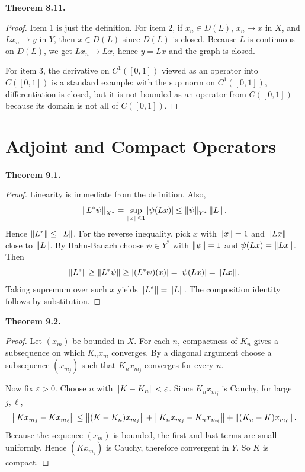 \documentclass[11pt]{article}
\newenvironment{theoremstmt}[1]{%
  \par\medskip\noindent\textbf{Theorem #1. }\itshape
}{\par\medskip}
\begin{document}
\begin{theoremstmt}{8.11}
\thmClosedOperatorFacts
\end{theoremstmt}

\begin{proof}
Item 1 is just the definition. For item 2, if $x_n\in D(L)$, $x_n\to x$ in $X$, and $Lx_n\to y$ in $Y$, then $x\in D(L)$ since $D(L)$ is closed. Because $L$ is continuous on $D(L)$, we get $Lx_n\to Lx$, hence $y=Lx$ and the graph is closed.

For item 3, the derivative on $C^1([0,1])$ viewed as an operator into $C([0,1])$ is a standard example: with the sup norm on $C^1([0,1])$, differentiation is closed, but it is not bounded as an operator from $C([0,1])$ because its domain is not all of $C([0,1])$.
\end{proof}

\section{Adjoint and Compact Operators}

\begin{theoremstmt}{9.1}
\thmAdjoint
\end{theoremstmt}

\begin{proof}
Linearity is immediate from the definition. Also,
\[
\left\lVert L^*\psi\right\rVert_{X^*}=\sup_{\left\lVert x\right\rVert\le 1}\left\lvert \psi(Lx)\right\rvert
\le \left\lVert \psi\right\rVert_{Y^*}\left\lVert L\right\rVert.
\]
Hence $\left\lVert L^*\right\rVert\le \left\lVert L\right\rVert$. For the reverse inequality, pick $x$ with $\left\lVert x\right\rVert=1$ and $\left\lVert Lx\right\rVert$ close to $\left\lVert L\right\rVert$. By Hahn-Banach choose $\psi\in Y^*$ with $\left\lVert \psi\right\rVert=1$ and $\psi(Lx)=\left\lVert Lx\right\rVert$. Then
\[
\left\lVert L^*\right\rVert\ge \left\lVert L^*\psi\right\rVert\ge \left\lvert (L^*\psi)(x)\right\rvert=\left\lvert \psi(Lx)\right\rvert=\left\lVert Lx\right\rVert.
\]
Taking supremum over such $x$ yields $\left\lVert L^*\right\rVert=\left\lVert L\right\rVert$. The composition identity follows by substitution.
\end{proof}

\begin{theoremstmt}{9.2}
\thmCompactLimit
\end{theoremstmt}

\begin{proof}
Let $(x_m)$ be bounded in $X$. For each $n$, compactness of $K_n$ gives a subsequence on which $K_nx_m$ converges. By a diagonal argument choose a subsequence $(x_{m_j})$ such that $K_nx_{m_j}$ converges for every $n$.

Now fix $\varepsilon>0$. Choose $n$ with $\left\lVert K-K_n\right\rVert<\varepsilon$. Since $K_nx_{m_j}$ is Cauchy, for large $j,\ell$,
\[
\left\lVert Kx_{m_j}-Kx_{m_\ell}\right\rVert
\le \left\lVert (K-K_n)x_{m_j}\right\rVert+\left\lVert K_nx_{m_j}-K_nx_{m_\ell}\right\rVert+\left\lVert (K_n-K)x_{m_\ell}\right\rVert.
\]
Because the sequence $(x_m)$ is bounded, the first and last terms are small uniformly. Hence $(Kx_{m_j})$ is Cauchy, therefore convergent in $Y$. So $K$ is compact.
\end{proof}
\end{document}
